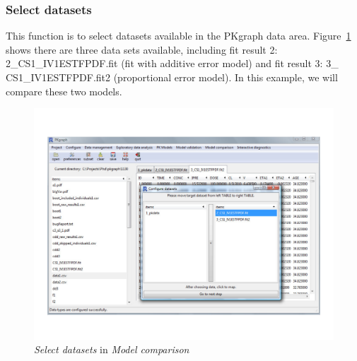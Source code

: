 \documentclass[a4paper]{article}
\begin{document}
\subsubsection{Select datasets}
This function is to select datasets available in the PKgraph data area. Figure~\ref{modelcData} shows there are three data sets available, including fit result 2:  2\_CS1\_IV1ESTFPDF.fit (fit with additive error model) and fit result 3: 3\_ CS1\_IV1ESTFPDF.fit2 (proportional error model). In this example, we will compare these two models.
\begin{figure}[h!tb] \centering
\includegraphics[scale=0.6]{modelcData.pdf}
\caption{\textit{Select datasets} in \textit{Model comparison}}
\label{modelcData}
\end{figure}
\end{document}
